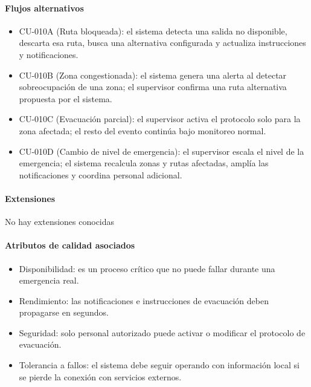 \paragraph{Flujos alternativos}
\begin{itemize}[leftmargin=1.4em, topsep=1pt]
  \item CU-010A (Ruta bloqueada): el sistema detecta una salida no disponible, descarta esa ruta, busca una alternativa configurada y actualiza instrucciones y notificaciones.
  \item CU-010B (Zona congestionada): el sistema genera una alerta al detectar sobreocupación de una zona; el supervisor confirma una ruta alternativa propuesta por el sistema.
  \item CU-010C (Evacuación parcial): el supervisor activa el protocolo solo para la zona afectada; el resto del evento continúa bajo monitoreo normal.
  \item CU-010D (Cambio de nivel de emergencia): el supervisor escala el nivel de la emergencia; el sistema recalcula zonas y rutas afectadas, amplía las notificaciones y coordina personal adicional.
\end{itemize}

\paragraph{Extensiones}
No hay extensiones conocidas

\paragraph{Atributos de calidad asociados}
\begin{itemize}[leftmargin=1.4em, topsep=1pt]
  \item Disponibilidad: es un proceso crítico que no puede fallar durante una emergencia real.
  \item Rendimiento: las notificaciones e instrucciones de evacuación deben propagarse en segundos.
  \item Seguridad: solo personal autorizado puede activar o modificar el protocolo de evacuación.
  \item Tolerancia a fallos: el sistema debe seguir operando con información local si se pierde la conexión con servicios externos.
\end{itemize}


